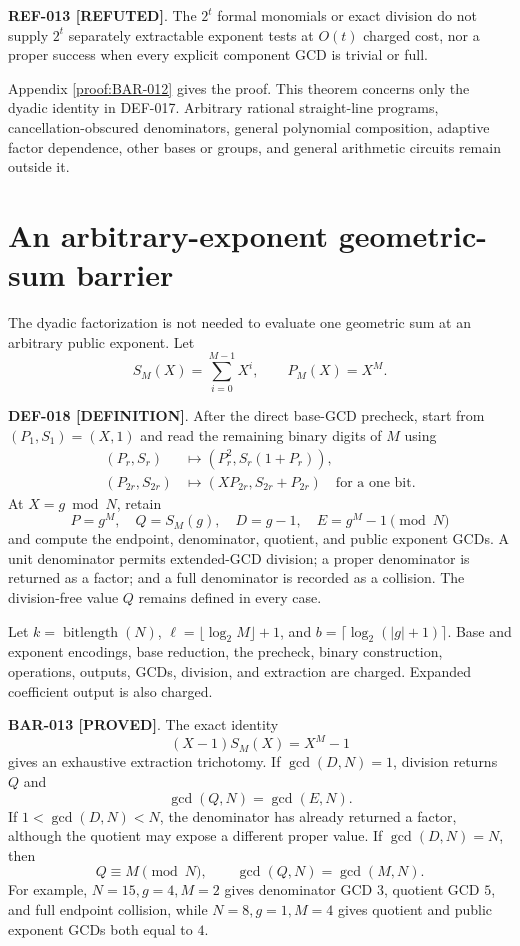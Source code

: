 \documentclass[11pt]{article}
\newcommand{\claimstatus}[2]{\textbf{#1 [#2]}}
\begin{document}
\claimstatus{REF-013}{REFUTED}. The \(2^t\) formal monomials or exact division
do not supply \(2^t\) separately extractable exponent tests at \(O(t)\)
charged cost, nor a proper success when every explicit component GCD is
trivial or full.

Appendix \ref{proof:BAR-012} gives the proof. This theorem concerns only the
dyadic identity in DEF-017. Arbitrary rational straight-line programs,
cancellation-obscured denominators, general polynomial composition, adaptive
factor dependence, other bases or groups, and general arithmetic circuits
remain outside it.

\section{An arbitrary-exponent geometric-sum barrier}

The dyadic factorization is not needed to evaluate one geometric sum at an
arbitrary public exponent. Let
\[
S_M(X)=\sum_{i=0}^{M-1}X^i,\qquad P_M(X)=X^M.
\]

\claimstatus{DEF-018}{DEFINITION}. After the direct base-GCD precheck, start
from \((P_1,S_1)=(X,1)\) and read the remaining binary digits of \(M\) using
\[
\begin{aligned}
(P_r,S_r)&\mapsto(P_r^2,S_r(1+P_r)),\\
(P_{2r},S_{2r})&\mapsto(XP_{2r},S_{2r}+P_{2r})
\quad\text{for a one bit}.
\end{aligned}
\]
At \(X=g\bmod N\), retain
\[
P=g^M,\quad Q=S_M(g),\quad D=g-1,\quad E=g^M-1\pmod N
\]
and compute the endpoint, denominator, quotient, and public exponent GCDs.
A unit denominator permits extended-GCD division; a proper denominator is
returned as a factor; and a full denominator is recorded as a collision.
The division-free value \(Q\) remains defined in every case.

Let \(k=\operatorname{bitlength}(N)\),
\(\ell=\lfloor\log_2M\rfloor+1\), and
\(b=\lceil\log_2(|g|+1)\rceil\). Base and exponent encodings, base reduction,
the precheck, binary construction, operations, outputs, GCDs, division, and
extraction are charged. Expanded coefficient output is also charged.

\claimstatus{BAR-013}{PROVED}. The exact identity
\[
(X-1)S_M(X)=X^M-1
\]
gives an exhaustive extraction trichotomy. If \(\gcd(D,N)=1\), division
returns \(Q\) and
\[
\gcd(Q,N)=\gcd(E,N).
\]
If \(1<\gcd(D,N)<N\), the denominator has already returned a factor, although
the quotient may expose a different proper value. If \(\gcd(D,N)=N\), then
\[
Q\equiv M\pmod N,\qquad \gcd(Q,N)=\gcd(M,N).
\]
For example, \(N=15,g=4,M=2\) gives denominator GCD \(3\), quotient GCD \(5\),
and full endpoint collision, while \(N=8,g=1,M=4\) gives quotient and public
exponent GCDs both equal to \(4\).
\end{document}
